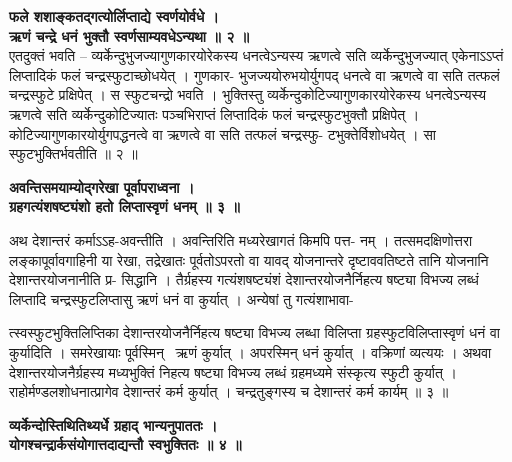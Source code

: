 \documentclass[11pt, openany]{book}
\begin{document}
{{{{\vspace{2mm}
\centering
\hspace{-1.7cm}
\textbf{
 फले शशाङ्कतद्गत्योर्लिप्ताद्ये स्वर्णयोर्वधे । \\
 ऋणं चन्द्रे धनं भुक्तौ स्वर्णसाम्यवधेऽन्यथा ॥ २ ॥ }\\

\vspace{2mm}
\justifying
 एतदुक्तं भवति -- व्यर्केन्दुभुजज्यागुणकारयोरेकस्य धनत्वेऽन्यस्य
ऋणत्वे सति 
व्यर्केन्दुभुजज्यात् एकेनाऽऽप्तं लिप्तादिकं फलं चन्द्रस्फुटाच्छोधयेत्
। गुणकार-
भुजज्ययोरुभयोर्युगपद् धनत्वे वा ऋणत्वे वा सति तत्फलं 
चन्द्रस्फुटे
प्रक्षिपेत् । 
स स्फुटचन्द्रो भवति । भुक्तिस्तु व्यर्केन्दुकोटिज्यागुणकारयोरेकस्य
धनत्वेऽन्यस्य 
ऋणत्वे सति व्यर्केन्दुकोटिज्यातः पञ्चभिराप्तं लिप्तादिकं फलं
चन्द्रस्फुटभुक्तौ 
प्रक्षिपेत् । कोटिज्यागुणकारयोर्युगपद्धनत्वे वा ऋणत्वे वा सति तत्फलं
चन्द्रस्फु-
टभुक्तेर्विशोधयेत् । सा स्फुटभुक्तिर्भवतीति ॥ २ ॥

\vspace{2mm}
\centering
\hspace{-1.7cm}
\textbf{
 अवन्तिसमयाम्योद्गरेखा पूर्वापराध्वना । \\
 ग्रहगत्यंशषष्ट्यंशो हतो लिप्तास्वृणं धनम् ॥ ३ ॥ }

\vspace{2mm}
\justifying
 अथ देशान्तरं कर्माऽऽह-अवन्तीति । अवन्तिरिति मध्यरेखागतं किमपि
पत्त-
नम् । तत्समदक्षिणोत्तरा लङ्कापूर्वावगाहिनी या रेखा, तद्रेखातः
पूर्वतोऽपरतो 
वा यावद् योजनान्तरे दृष्टाववतिष्टते तानि योजनानि देशान्तरयोजनानीति
प्र-
सिद्धानि । तैर्ग्रहस्य गत्यंशषष्ट्यंशं देशान्तरयोजनैर्निहत्य षष्ट्या
विभज्य लब्धं 
लिप्तादि चन्द्रस्फुटलिप्तासु ऋणं धनं वा कुर्यात् । अन्येषां तु
गत्यंशाभावा-

\newpage
\thispagestyle{fancy}
\fancyhf{}
\lhead{[प्रकीर्णकाधिकारः]}
\justifying
\noindent
त्स्वस्फुटभुक्तिलिप्तिका देशान्तरयोजनैर्निहत्य षष्ट्या विभज्य लब्धा
विलिप्ता 
ग्रहस्फुटविलिप्तास्वृणं धनं वा कुर्यादिति । समरेखायाः पूर्वस्मिन्  ऋणं  कुर्यात् । अपरस्मिन् धनं कुर्यात् । वक्रिणां व्यत्ययः । अथवा
देशान्तरयोजनैर्ग्रहस्य 
मध्यभुक्तिं निहत्य षष्ट्या विभज्य लब्धं ग्रहमध्यमे संस्कृत्य स्फुटी
कुर्यात् ।
राहोर्मण्डलशोधनात्प्रागेव देशान्तरं कर्म कुर्यात् । चन्द्रतुङ्गस्य च
देशान्तरं 
कर्म कार्यम् ॥ ३ ॥

\centering
\hspace{-0.5cm}
\textbf{
 व्यर्केन्दोस्तिथितिथ्यर्धे ग्रहाद् भान्यनुपाततः । \\
 योगश्चन्द्रार्कसंयोगात्तदाद्यन्तौ स्वभुक्तितः ॥ ४ ॥ }

}}}}
\end{document}
